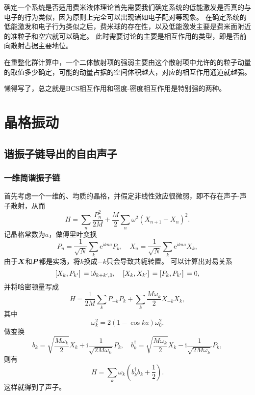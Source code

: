 \documentclass[hyperref, UTF8, a4paper]{ctexart}
\newcommand*{\ii}{\mathrm{i}}
\newcommand*{\ee}{\mathrm{e}}
\begin{document}
确定一个系统是否适用费米液体理论首先需要我们确定系统的低能激发是否真的与电子的行为类似，因为原则上完全可以出现诸如电子配对等现象。
在确定系统的低能激发和电子行为类似之后，费米球的存在性，以及低能激发主要是费米面附近的准粒子和空穴就可以确定。
此时需要讨论的主要是相互作用的类型，即是否前向散射占据主要地位。

在重整化群计算中，一个二体散射项的强弱主要由这个散射项中允许的的粒子动量的取值多少确定，可能的动量占据的空间体积越大，对应的相互作用通道就越强。

懒得写了，总之就是BCS相互作用和密度-密度相互作用是特别强的两种。


\section{晶格振动}

\subsection{谐振子链导出的自由声子}

\subsubsection{一维简谐振子链}

首先考虑一个一维的、均质的晶格，并假定非线性效应很微弱，即不存在声子-声子散射，从而
\begin{equation}
    {H} = \sum_n \frac{{P}_n^2}{2 M} + \frac{M}{2} \sum_{n} \omega^2 ({X}_{n+1} - {X}_{n})^2.
    \label{eq:one-dim-osc-hamiltonian}
\end{equation}
记晶格常数为$a$，做傅里叶变换
\[
    {P}_n = \frac{1}{\sqrt{N}} \sum_{k} \ee^{\ii k n a} {P}_k, \quad {X}_n = \frac{1}{\sqrt{N}} \sum_{k} \ee^{\ii k n a} {X}_k,
\]
由于$\vb*{X}$和$\vb*{P}$都是实场，将$k$换成$-k$只会导致共轭转置。
可以计算出对易关系
\begin{equation}
    \comm*{{X}_{k}}{{P}_{k'}} = \ii \delta_{k+k', 0}, \quad \comm*{{X}_{k}}{{X}_{k'}} = \comm*{{P}_{k}}{{P}_{k'}} = 0,
\end{equation}
并将哈密顿量写成
\[
    {H} = \frac{1}{2M} \sum_{k} {P}_{-k} {P}_{k} + \sum_k \frac{M \omega_{k}}{2} {X}_{-k} {X}_k,
\]
其中
\begin{equation}
    \omega_k^2 = 2 (1 - \cos k a) \omega_0^2.
\end{equation}
做变换
\begin{equation}
    {b}_{k} = \sqrt{\frac{M \omega_k}{2}} {X}_k + \ii \frac{1}{\sqrt{2 M \omega_k}} P_k, \quad {b}^\dagger_{k} = \sqrt{\frac{M \omega_k}{2}} {X}_k - \ii \frac{1}{\sqrt{2 M \omega_k}} P_k,
\end{equation}
则有
\begin{equation}
    {H} = \sum_k \omega_k \left({b}^\dagger_k {b}_k + \frac{1}{2}\right).
\end{equation}
这样就得到了声子。
\end{document}
